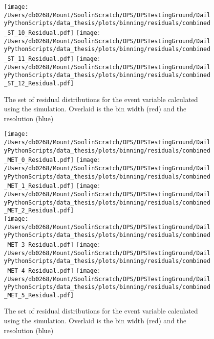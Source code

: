 \begin{figure}[htpb]
	\texttt{[image: /Users/db0268/Mount/SoolinScratch/DPS/DPSTestingGround/DailyPythonScripts/data\_thesis/plots/binning/residuals/combined\_ST\_10\_Residual.pdf]} 
	\texttt{[image: /Users/db0268/Mount/SoolinScratch/DPS/DPSTestingGround/DailyPythonScripts/data\_thesis/plots/binning/residuals/combined\_ST\_11\_Residual.pdf]}
	\texttt{[image: /Users/db0268/Mount/SoolinScratch/DPS/DPSTestingGround/DailyPythonScripts/data\_thesis/plots/binning/residuals/combined\_ST\_12\_Residual.pdf]}
	\caption[The set of residual distributions for the \ST{} event variable calculated using the \powhegpythia{} simulation. Overlaid is the bin width (red) and the resolution (blue)]{The set of residual distributions for the \ST{} event variable calculated using the \powhegpythia{} simulation. Overlaid is the bin width (red) and the resolution (blue)}
	\label{fig:ResST}
\end{figure}
\begin{figure}[htpb]
	\centering
	\texttt{[image: /Users/db0268/Mount/SoolinScratch/DPS/DPSTestingGround/DailyPythonScripts/data\_thesis/plots/binning/residuals/combined\_MET\_0\_Residual.pdf]}
	\texttt{[image: /Users/db0268/Mount/SoolinScratch/DPS/DPSTestingGround/DailyPythonScripts/data\_thesis/plots/binning/residuals/combined\_MET\_1\_Residual.pdf]}
	\texttt{[image: /Users/db0268/Mount/SoolinScratch/DPS/DPSTestingGround/DailyPythonScripts/data\_thesis/plots/binning/residuals/combined\_MET\_2\_Residual.pdf]} \\
	\texttt{[image: /Users/db0268/Mount/SoolinScratch/DPS/DPSTestingGround/DailyPythonScripts/data\_thesis/plots/binning/residuals/combined\_MET\_3\_Residual.pdf]} 
	\texttt{[image: /Users/db0268/Mount/SoolinScratch/DPS/DPSTestingGround/DailyPythonScripts/data\_thesis/plots/binning/residuals/combined\_MET\_4\_Residual.pdf]} 
	\texttt{[image: /Users/db0268/Mount/SoolinScratch/DPS/DPSTestingGround/DailyPythonScripts/data\_thesis/plots/binning/residuals/combined\_MET\_5\_Residual.pdf]} \\
	\caption[The set of residual distributions for the \ptmiss{} event variable calculated using the \powhegpythia{} simulation. Overlaid is the bin width (red) and the resolution (blue)]{The set of residual distributions for the \ptmiss{} event variable calculated using the \powhegpythia{} simulation. Overlaid is the bin width (red) and the resolution (blue)}
	\label{fig:ResMET}
\end{figure}
